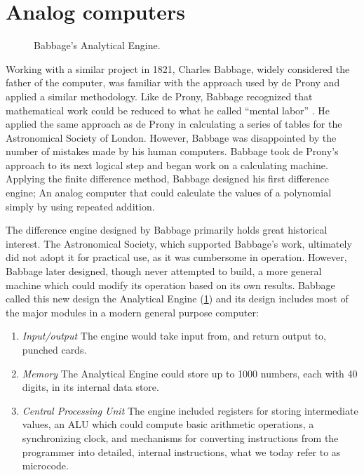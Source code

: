 \documentclass[\rootfolder/main.tex]{subfiles}
\begin{document}
\section{Analog computers}

\begin{figure}[ht]
    \caption{Babbage's Analytical Engine.}
    \label{fig:engine}
\end{figure}

Working with a similar project in 1821, Charles Babbage, widely considered the father of the computer, was familiar with the approach used by de Prony and applied a similar methodology.
Like de Prony, Babbage recognized that mathematical work could be reduced to what he called ``mental labor'' \cite{babbage1832}.
He applied the same approach as de Prony in calculating a series of tables for the Astronomical Society of London.
However, Babbage was disappointed by the number of mistakes made by his human computers.
Babbage took de Prony's approach to its next logical step and began work on a calculating machine.
Applying the finite difference method, Babbage designed his first difference engine; An analog computer that could calculate the values of a polynomial simply by using repeated addition.

The difference engine designed by Babbage primarily holds great historical interest.
The Astronomical Society, which supported Babbage's work, ultimately did not adopt it for practical use, as it was cumbersome in operation.
However, Babbage later designed, though never attempted to build, a more general machine which could modify its operation based on its own results.
Babbage called this new design the Analytical Engine (\cref{fig:engine}) and its design includes most of the major modules in a modern general purpose computer:

\begin{enumerate}
  \item \textit{Input/output} The engine would take input from, and return output to, punched cards.
  \item \textit{Memory} The Analytical Engine could store up to 1000 numbers, each with 40 digits, in its internal data store.
  \item \textit{Central Processing Unit} The engine included registers for storing intermediate values, an ALU which could compute basic arithmetic operations, a synchronizing clock,
      and mechanisms for converting instructions from the programmer into detailed, internal instructions, what we today refer to as microcode.
\end{enumerate}
\end{document}
